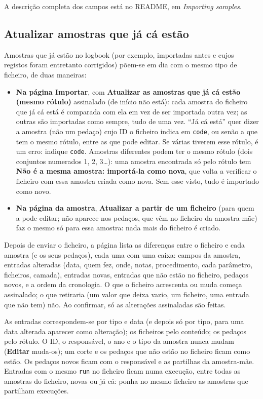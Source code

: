 \documentclass[11pt,a4paper]{article}
\newcommand{\ui}[1]{\textsf{\textbf{#1}}}
\begin{document}
A descrição completa dos campos está no README, em \emph{Importing samples}.

\subsection{Atualizar amostras que já cá estão}
\label{sec:update-from-file}

Amostras que já estão no logbook (por exemplo, importadas antes e cujos
registos foram entretanto corrigidos) põem-se em dia com o mesmo tipo de
ficheiro, de duas maneiras:

\begin{itemize}
  \item \textbf{Na página Importar}, com \ui{Atualizar as amostras que já cá
        estão (mesmo rótulo)} assinalado (de início não está): cada amostra do
        ficheiro que já cá está é comparada com ela em vez de ser importada
        outra vez; as outras são importadas como sempre, tudo de uma vez.
        ``Já cá está'' quer dizer a amostra (não um pedaço) cujo ID o
        ficheiro indica em \texttt{code}, ou senão a que tem o mesmo rótulo,
        entre as que pode editar. Se várias tiverem esse rótulo, é um erro:
        indique \texttt{code}. Amostras diferentes podem ter o mesmo rótulo
        (dois conjuntos numerados 1, 2, 3\ldots): uma amostra encontrada só
        pelo rótulo tem \ui{Não é a mesma amostra: importá-la como nova}, que
        volta a verificar o ficheiro com essa amostra criada como nova. Sem
        esse visto, tudo é importado como novo.
  \item \textbf{Na página da amostra}, \ui{Atualizar a partir de um ficheiro}
        (para quem a pode editar; não aparece nos pedaços, que vêm no ficheiro
        da amostra-mãe) faz o mesmo só para essa amostra: nada mais do
        ficheiro é criado.
\end{itemize}

Depois de enviar o ficheiro, a página lista as diferenças entre o ficheiro e
cada amostra (e os seus pedaços), cada uma com uma caixa: campos da amostra,
entradas alteradas (data, quem fez, onde, notas, procedimento, cada parâmetro,
ficheiros, camada), entradas novas, entradas que não estão no ficheiro, pedaços
novos, e a ordem da cronologia. O que o ficheiro acrescenta ou muda começa
assinalado; o que retiraria (um valor que deixa vazio, um ficheiro, uma entrada
que não tem) não. Ao confirmar, só as alterações assinaladas são feitas.

As entradas correspondem-se por tipo e data (e depois só por tipo, para uma
data alterada aparecer como alteração); os ficheiros pelo conteúdo; os pedaços
pelo rótulo. O ID, o responsável, o ano e o tipo da amostra nunca mudam
(\ui{Editar} muda-os); um corte e os pedaços que não estão no ficheiro ficam
como estão. Os pedaços novos ficam com o responsável e as partilhas da
amostra-mãe. Entradas com o mesmo \texttt{run} no ficheiro ficam numa execução,
entre todas as amostras do ficheiro, novas ou já cá: ponha no mesmo ficheiro as
amostras que partilham execuções.
\end{document}
